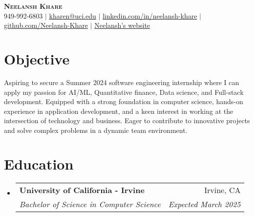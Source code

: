 \documentclass[letterpaper,11pt]{article}
\makeatletter
\newcommand{\resumeSubheading}[4]{
  \vspace{-2pt}\item
    \begin{tabular*}{0.97\textwidth}[t]{l@{\extracolsep{\fill}}r}
      \textbf{#1} & #2 \\
      \textit{\small#3} & \textit{\small #4} \\
    \end{tabular*}\vspace{-7pt}
}
\newcommand{\resumeSubHeadingListStart}{\begin{itemize}[leftmargin=0.15in, label={}]}
\newcommand{\resumeSubHeadingListEnd}{\end{itemize}}
\makeatother
\begin{document}
\begin{center}  
    \textbf{\Huge \scshape Neelansh Khare} \\ \vspace{1pt}
    \small 949-992-6803 $|$ \href{mailto:kharen@uci.edu}{{kharen@uci.edu}} $|$ 
    \href{https://linkedin.com/in/neelansh-khare}{{linkedin.com/in/neelansh-khare}} $|$
    \href{https://github.com/Neelansh-Khare}{{github.com/Neelansh-Khare}} $|$
    \href{https://neelanshkhare.notion.site/d518ba0af3604c1189da03c6ab047f3c}{{Neelansh's website}}
\end{center}

\section{Objective}
\begin{itemize}[leftmargin=0.15in, label={}]
  \small{\item{
   \textbf{}{Aspiring to secure a Summer 2024 software engineering internship where I can apply my passion for AI/ML, Quantitative finance, Data science, and Full-stack development. Equipped with a strong foundation in computer science, hands-on experience in application development, and a keen interest in working at the intersection of technology and business. Eager to contribute to innovative projects and solve complex problems in a dynamic team environment.} \\
  }}
  \end{itemize}


\section{Education}
  \resumeSubHeadingListStart
    \resumeSubheading
      {University of California - Irvine}{Irvine, CA}
      {Bachelor of Science in Computer Science}{Expected March 2025}
  \resumeSubHeadingListEnd
  
\end{document}
